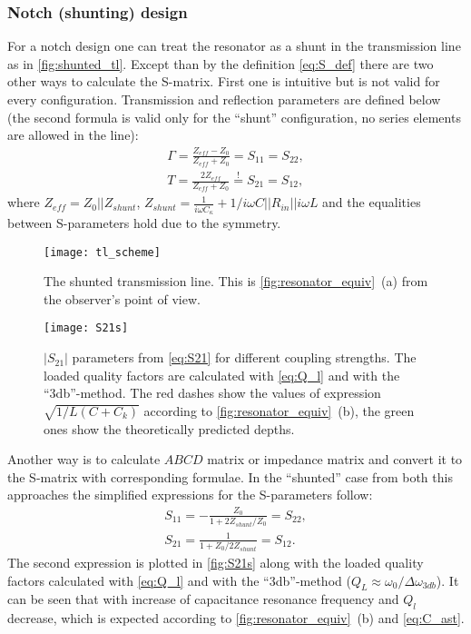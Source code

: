 \subsubsection{Notch (shunting) design}
For a notch design one can treat the resonator as a shunt in the transmission line as in \autoref{fig:shunted_tl}. Except than by the definition \eqref{eq:S_def} there are two other ways to calculate the S-matrix. First one is intuitive but is not valid for every configuration. Transmission and reflection parameters are defined\cite{Kiselev2013} below (the second formula is valid only for the ``shunt'' configuration, no series elements are allowed in the line):
\begin{gather}    
\Gamma = \frac{Z_{eff} - Z_{0}}{Z_{eff} + Z_{0}} = S_{11} = S_{22}, \label{eGamma}\\
T = \frac{2Z_{eff}}{Z_{eff}+Z_0} \overset{!}{=} S_{21} = S_{12}, \label{eT}
\end{gather}
where $Z_{eff} = Z_0 || Z_{shunt}$, $Z_{shunt} = \frac{1}{i\omega C_\kappa} + 1/i\omega C||R_{in}||i\omega L$ and the equalities between S-parameters hold due to the symmetry.
\begin{figure}[h]
\centering
\texttt{[image: tl\_scheme]}
\caption{The shunted transmission line. This is \autoref{fig:resonator_equiv}~(a)  from the observer's point of view.}
\label{fig:shunted_tl}
\end{figure}
\begin{figure}[h]
\centering
\texttt{[image: S21s]}
\caption{ $|S_{21}|$ parameters from \eqref{eq:S21} for different coupling strengths. The loaded quality factors are calculated with \eqref{eq:Q_l} and with the ``3db''-method. The red dashes show the values of expression $\sqrt{1/L(C+C_k)}$ according to \autoref{fig:resonator_equiv}~(b), the green ones show the theoretically predicted depths.}
\label{fig:S21s}
\end{figure}

Another way is to calculate $ABCD$ matrix or impedance matrix and convert it to the S-matrix with corresponding formulae\cite{pozar2012}. In the ``shunted'' case from both this approaches the simplified expressions for the S-parameters follow:
\begin{gather}
S_{11} = -\frac{Z_0}{1 + 2Z_{shunt}/Z_0} = S_{22}, \\
S_{21} = \frac{1}{1+Z_0/2Z_{shunt}} = S_{12}. \label{eq:S21}
\end{gather}
The second expression is plotted in \autoref{fig:S21s} along with the loaded quality factors calculated with \eqref{eq:Q_l} and with the ``3db''-method ($Q_L \approx \omega_0/\Delta\omega_{3db}$). It can be seen that with increase of capacitance resonance frequency and $Q_l$ decrease, which is expected according to \autoref{fig:resonator_equiv}~(b) and \eqref{eq:C_ast}.

